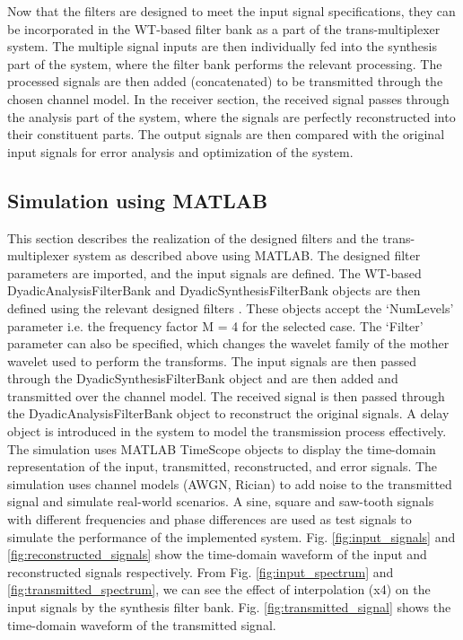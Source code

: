 \documentclass[conference]{IEEEtran}
\begin{document}
Now that the filters are designed to meet the input signal specifications, they can be incorporated in the WT-based filter bank as a part of the trans-multiplexer system. The multiple signal inputs are then individually fed into the synthesis part of the system, where the filter bank performs the relevant processing. The processed signals are then added (concatenated) to be transmitted through the chosen channel model. In the receiver section, the received signal passes through the analysis part of the system, where the signals are perfectly reconstructed into their constituent parts. The output signals are then compared with the original input signals for error analysis and optimization of the system.

\subsection{Simulation using MATLAB}
This section describes the realization of the designed filters and the trans-multiplexer system as described above using MATLAB. The designed filter parameters are imported, and the input signals are defined. The WT-based DyadicAnalysisFilterBank and DyadicSynthesisFilterBank objects are then defined using the relevant designed filters \cite{b20}. These objects accept the ‘NumLevels’ parameter i.e. the frequency factor M = 4 for the selected case. The ‘Filter’ parameter can also be specified, which changes the wavelet family of the mother wavelet used to perform the transforms. The input signals are then passed through the DyadicSynthesisFilterBank object and are then added and transmitted over the channel model. The received signal is then passed through the DyadicAnalysisFilterBank object to reconstruct the original signals. A delay object is introduced in the system to model the transmission process effectively. The simulation uses MATLAB TimeScope objects to display the time-domain representation of the input, transmitted, reconstructed, and error signals. The simulation uses channel models (AWGN, Rician) to add noise to the transmitted signal and simulate real-world scenarios. A sine, square and saw-tooth signals with different frequencies and phase differences are used as test signals to simulate the performance of the implemented system. Fig. \ref{fig:input_signals} and \ref{fig:reconstructed_signals} show the time-domain waveform of the input and reconstructed signals respectively. From Fig. \ref{fig:input_spectrum} and \ref{fig:transmitted_spectrum}, we can see the effect of interpolation (x4) on the input signals by the synthesis filter bank. Fig. \ref{fig:transmitted_signal} shows the time-domain waveform of the transmitted signal.
\end{document}
